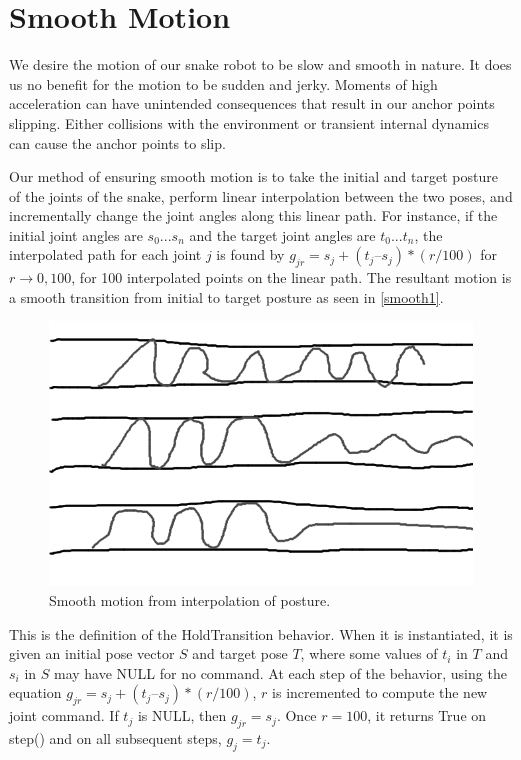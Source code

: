 \section{Smooth Motion}
\label{sec:smooth}

We desire the motion of our snake robot to be slow and smooth in nature. It does us no benefit for the motion to be sudden and jerky. Moments of high acceleration can have unintended consequences that result in our anchor points slipping. Either collisions with the environment or transient internal dynamics can cause the anchor points to slip.

Our method of ensuring smooth motion is to take the initial and target posture of the joints of the snake, perform linear interpolation between the two poses, and incrementally change the joint angles along this linear path. For instance, if the initial joint angles are ${s_0 ... s_n}$ and the target joint angles are ${t_0 ... t_n}$, the interpolated path for each joint $j$ is found by $g_{jr} = s_j + (t_j – s_j) * (r/100)$ for $r \to {0, 100}$, for 100 interpolated points on the linear path. The resultant motion is a smooth transition from initial to target posture as seen in \autoref{smooth1}.

\begin{figure}[htbp]
\centering
\includegraphics[keepaspectratio,width=400pt,height=0.75\textheight]{2_smooth_1.png}
\caption{Smooth motion from interpolation of posture.}
\label{smooth1}
\end{figure}



This is the definition of the HoldTransition behavior. When it is instantiated, it is given an initial pose vector $S$ and target pose $T$, where some values of $t_i$ in $T$ and $s_i$ in $S$ may have NULL for no command. At each step of the behavior, using the equation $g_{jr} = s_j + (t_j – s_j) * (r/100)$, $r$ is incremented to compute the new joint command. If $t_j$ is NULL, then $g_{jr} = s_j$. Once $r = 100$, it returns True on step() and on all subsequent steps, $g_j = t_j$.

